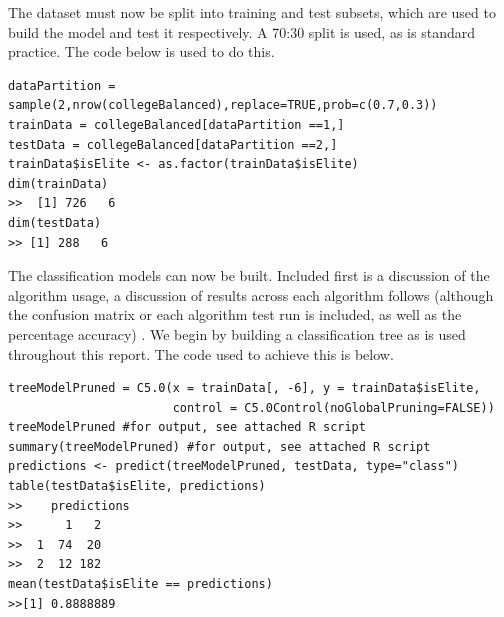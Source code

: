 \documentclass[paper=a4, fontsize=11pt]{scrartcl} %
\begin{document}
{{\par The dataset must now be split into training and test subsets, which are used to build the model and test it respectively. A 70:30 split is used, as is standard practice. The code below is used to do this. 
\begin{lstlisting}
dataPartition = sample(2,nrow(collegeBalanced),replace=TRUE,prob=c(0.7,0.3))
trainData = collegeBalanced[dataPartition ==1,]
testData = collegeBalanced[dataPartition ==2,]
trainData$isElite <- as.factor(trainData$isElite)
dim(trainData)
>>  [1] 726   6
dim(testData)
>> [1] 288   6
\end{lstlisting}}
{\par The classification models can now be built. Included first is a discussion of the algorithm usage, a discussion of results across each algorithm follows (although the confusion matrix or each algorithm test run is included, as well as the percentage accuracy) . We begin by building a classification tree as is used throughout this report. The code used to achieve this is below.
\begin{lstlisting}
treeModelPruned = C5.0(x = trainData[, -6], y = trainData$isElite,
                       control = C5.0Control(noGlobalPruning=FALSE))
treeModelPruned #for output, see attached R script
summary(treeModelPruned) #for output, see attached R script 
predictions <- predict(treeModelPruned, testData, type="class")
table(testData$isElite, predictions)
>>    predictions
>>      1   2
>>  1  74  20
>>  2  12 182
mean(testData$isElite == predictions) 
>>[1] 0.8888889


\end{lstlisting}}}
\end{document}

